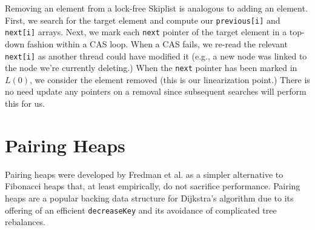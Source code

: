 \documentclass{acm_proc_article-sp}
\begin{document}
Removing an element from a lock-free Skiplist is analogous to adding an element.
First, we search for the target element and compute our \texttt{previous[i]} and \texttt{next[i]}
arrays. Next, we mark each
\texttt{next} pointer of the target element in a top-down fashion within a CAS loop. When a CAS fails,
we re-read the relevant \texttt{next[i]} as another thread could have modified it (e.g., a
new node was linked to the node we're currently deleting.) When the \texttt{next}
pointer has been marked in $L(0)$, we consider the element removed (this is our linearization
point.) There is no need update any pointers on a removal since subsequent searches will perform
this for us.



\section{Pairing Heaps}
\label{sec:pheap}

Pairing heaps were developed by Fredman et al. \cite{fredman86} as
a simpler alternative to Fibonacci heaps that, at least empirically,
do not sacrifice performance.
Pairing heaps are a popular backing data structure
for Dijkstra's algorithm due to its offering of an efficient
\texttt{decreaseKey} and its avoidance of complicated tree rebalances.
\end{document}
